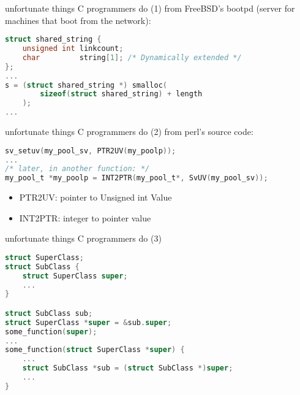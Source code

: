 \begin{frame}[fragile,label=unfortunateCProg1]{unfortunate things C programmers do (1)}
from FreeBSD's bootpd (server for machines that boot from the network):
\begin{lstlisting}[language=C,style=smaller]
struct shared_string {
    unsigned int linkcount;
    char         string[1]; /* Dynamically extended */
};
...
s = (struct shared_string *) smalloc(
        sizeof(struct shared_string) + length
    );
...
\end{lstlisting}
\end{frame}

\begin{frame}[fragile,label=unfortunateCProg2]{unfortunate things C programmers do (2)}
from perl's source code:
\begin{lstlisting}[language=C,style=small]
sv_setuv(my_pool_sv, PTR2UV(my_poolp));
...
/* later, in another function: */
my_pool_t *my_poolp = INT2PTR(my_pool_t*, SvUV(my_pool_sv));
\end{lstlisting}
\begin{itemize}
\item PTR2UV: pointer to Unsigned int Value
\item INT2PTR: integer to pointer value
\end{itemize}
\end{frame}

\begin{frame}[fragile,label=unfortunateCProg3]{unfortunate things C programmers do (3)}
\begin{lstlisting}[language=C,style=small]
struct SuperClass;
struct SubClass {
    struct SuperClass super;
    ...
}

struct SubClass sub;
struct SuperClass *super = &sub.super;
some_function(super);
...
some_function(struct SuperClass *super) {
    ...
    struct SubClass *sub = (struct SubClass *)super;
    ...
}
\end{lstlisting}
\end{frame}

